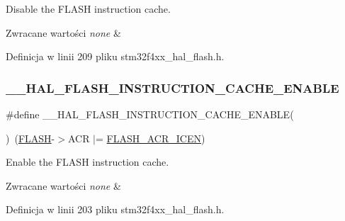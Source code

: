Disable the F\+L\+A\+SH instruction cache. 


\begin{DoxyRetVals}{Zwracane wartości}
{\em none} & \\
\hline
\end{DoxyRetVals}


Definicja w linii 209 pliku stm32f4xx\+\_\+hal\+\_\+flash.\+h.

\mbox{\label{group___f_l_a_s_h___exported___macros_gaddb00cd85fe48a524fad33c7fe63e038}} 
\subsubsection{\texorpdfstring{\+\_\+\+\_\+\+H\+A\+L\+\_\+\+F\+L\+A\+S\+H\+\_\+\+I\+N\+S\+T\+R\+U\+C\+T\+I\+O\+N\+\_\+\+C\+A\+C\+H\+E\+\_\+\+E\+N\+A\+B\+LE}{\_\_HAL\_FLASH\_INSTRUCTION\_CACHE\_ENABLE}}
{\footnotesize\ttfamily \#define \+\_\+\+\_\+\+H\+A\+L\+\_\+\+F\+L\+A\+S\+H\+\_\+\+I\+N\+S\+T\+R\+U\+C\+T\+I\+O\+N\+\_\+\+C\+A\+C\+H\+E\+\_\+\+E\+N\+A\+B\+LE(\begin{DoxyParamCaption}{ }\end{DoxyParamCaption})~(\hyperlink{group___peripheral__declaration_ga844ea28ba1e0a5a0e497f16b61ea306b}{F\+L\+A\+SH}-\/$>$A\+CR $\vert$= \hyperlink{group___peripheral___registers___bits___definition_ga51d8b1dd2c46942d377c579a38dce711}{F\+L\+A\+S\+H\+\_\+\+A\+C\+R\+\_\+\+I\+C\+EN})}



Enable the F\+L\+A\+SH instruction cache. 


\begin{DoxyRetVals}{Zwracane wartości}
{\em none} & \\
\hline
\end{DoxyRetVals}


Definicja w linii 203 pliku stm32f4xx\+\_\+hal\+\_\+flash.\+h.

